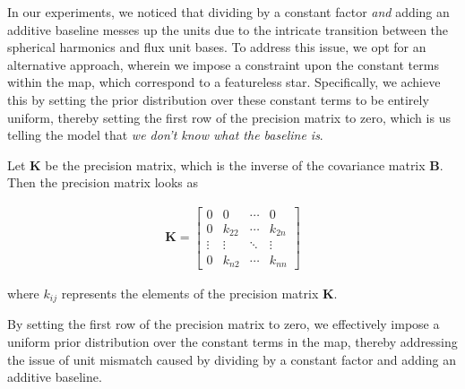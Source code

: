 \documentclass[twocolumn]{aastex631}
\begin{document}
In our experiments, we noticed that dividing by a constant factor \emph{and} adding an additive baseline messes up the units due to the 
intricate transition between the spherical harmonics and flux unit bases. To address this issue, we opt for an alternative approach, wherein we 
impose a constraint upon the constant terms within the map, which correspond to a featureless star. Specifically, we achieve this by setting the prior distribution 
over these constant terms to be entirely uniform, thereby setting the first row of the precision matrix to zero, which is us telling the model that
\textit{we don't know what the baseline is}.

Let $\mathbf{K}$ be the precision matrix, which is the inverse of the covariance matrix $\mathbf{B}$. Then the precision matrix looks as
%
\begin{linenomath}\begin{align}
    \mathbf{K} = 
    \begin{bmatrix}
    0 & 0 & \cdots & 0 \\
    0 & k_{22} & \cdots & k_{2n} \\
    \vdots & \vdots & \ddots & \vdots \\
    0 & k_{n2} & \cdots & k_{nn}
    \end{bmatrix}
\end{align}\end{linenomath}
%
where $k_{ij}$ represents the elements of the precision matrix $\mathbf{K}$.

By setting the first row of the precision matrix to zero, we effectively impose a uniform prior distribution over the constant terms in the map, thereby 
addressing the issue of unit mismatch caused by dividing by a constant factor and adding an additive baseline.
\end{document}
